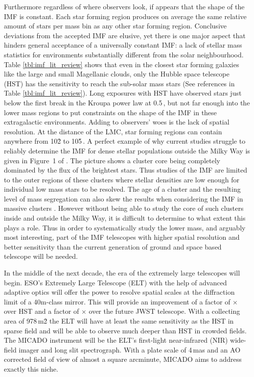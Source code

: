 Furthermore regardless of where observers look, if appears that the shape of the IMF is constant. Each star forming region produces on average the same relative amount of stars per mass bin as any other star forming region. Conclusive deviations from the accepted IMF are elusive, yet there is one major aspect that hinders general acceptance of a universally constant IMF: a lack of stellar mass statistics for environments substantially different from the solar neighbourhood. Table \ref{tbl:imf_lit_review} shows that even in the closest star forming galaxies like the large and small Magellanic clouds, only the Hubble space telescope (HST) has the sensitivity to reach the sub-solar mass stars (See references in Table \ref{tbl:imf_lit_review}). Long exposures with HST have observed stars just below the first break in the Kroupa power law at 0.5\,\msun \citep{dario2009,kalirai2013,geha2013}, but not far enough into the lower mass regions to put constraints on the shape of the IMF in these extragalactic environments. Adding to observers' woes is the lack of spatial resolution. At the distance of the LMC, star forming regions can contain anywhere from 10\h2 to 10\h5\,\spa. A perfect example of why current studies struggle to reliably determine the IMF for dense stellar populations outside the Milky Way is given in Figure~1 of \citet{sirianni2000}. The picture shows a cluster core being completely dominated by the flux of the brightest stars. Thus studies of the IMF are limited to the outer regions of these clusters where stellar densities are low enough for individual low mass stars to be resolved. The age of a cluster and the resulting level of mass segregation can also skew the results when considering the IMF in massive clusters \citep{lim2013}. However without being able to study the core of such clusters inside and outside the Milky Way, it is difficult to determine to what extent this plays a role. Thus in order to systematically study the lower mass, and arguably most interesting, part of the IMF telescopes with higher spatial resolution and better sensitivity than the current generation of ground and space based telescope will be needed.

In the middle of the next decade, the era of the extremely large telescopes will begin. ESO's Extremely Large Telescope (ELT) \citep{eelt} with the help of advanced adaptive optics \citep{maory} will offer the power to resolve spatial scales at the diffraction limit of a 40m-class mirror. This will provide an improvement of a factor of $\times$ over HST and a factor of $\times$ over the future JWST telescope. With a collecting area of 978\,m\h2 the ELT will have at least the same sensitivity as the HST in sparse field and will be able to observe much deeper than HST in crowded fields. The MICADO instrument \citep{micado, micado2016} will be the ELT's first-light near-infrared (NIR) wide-field imager and long slit spectrograph. With a plate scale of 4\,mas and an AO corrected field of view of almost a square arcminute, MICADO aims to address exactly this niche. 

